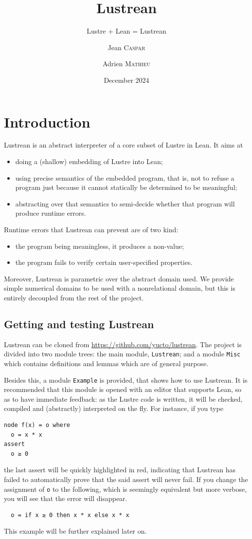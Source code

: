 \documentclass{scrartcl}
\title{Lustrean}
\subtitle{Lustre + Lean = Lustrean}
\author{Jean \textsc{Caspar} \and Adrien \textsc{Mathieu}}
\date{December 2024}
\begin{document}
\maketitle
\tableofcontents

\pagebreak

\section*{Introduction}
Lustrean is an abstract interpreter of a core subset of Lustre in Lean.  It aims at
\begin{itemize}
\item doing a (shallow) embedding of Lustre into Lean;
\item using precise semantics of the embedded program, that is, not to refuse a program just
  because it cannot statically be determined to be meaningful;
\item abstracting over that semantics to semi-decide whether that program will produce runtime
  errors.
\end{itemize}
Runtime errors that Lustrean can prevent are of two kind:
\begin{itemize}
\item the program being meaningless, it produces a non-value;
\item the program fails to verify certain user-specified properties.
\end{itemize}

Moreover, Lustrean is parametric over the abstract domain used.  We provide simple numerical
domains to be used with a nonrelational domain, but this is entirely decoupled from the rest of
the project.

\subsection*{Getting and testing Lustrean}
Lustrean can be cloned from \url{https://github.com/yucto/lustrean}.  The project is divided into
two module trees: the main module, \texttt{Lustrean}; and a module \texttt{Misc} which contains
definitions and lemmas which are of general purpose.

Besides this, a module \texttt{Example} is provided, that shows how to use Lustrean.  It is
recommended that this module is opened with an editor that supports Lean, so as to have immediate
feedback: as the Lustre code is written, it will be checked, compiled and (abstractly)
interpreted on the fly.  For instance, if you type
\begin{verbatim}
node f(x) = o where
  o = x * x
assert
  o ≥ 0
\end{verbatim}
the last assert will be quickly highlighted in red, indicating that Lustrean has failed to
automatically prove that the said assert will never fail.  If you change the assignment of
\texttt{o} to the following, which is seemingly equivalent but more verbose, you will see that
the error will disappear.
\begin{verbatim}
  o = if x ≥ 0 then x * x else x * x
\end{verbatim}
This example will be further explained later on.
\end{document}
